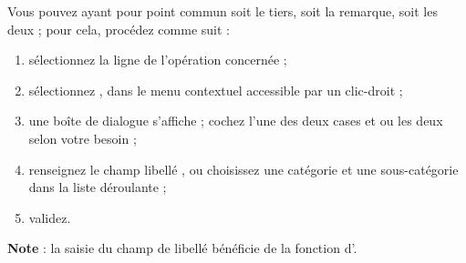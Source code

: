 Vous pouvez  ayant pour point commun soit le tiers, soit la remarque, soit les deux ; pour cela, procédez comme suit :

\begin{enumerate}
	\ifIllustration
	\pichskip{8mm}
	\label{categories_transfer-img}
	\fi
	
	 \item sélectionnez la ligne de l'opération concernée ;
	 \item sélectionnez , dans le menu contextuel accessible par un  clic-droit ;
	 \item une boîte de dialogue s'affiche ; cochez l'une des deux cases  et  ou les deux selon votre besoin ;
	 \item renseignez le champ libellé , ou choisissez une catégorie et une sous-catégorie dans la liste déroulante ;
	 \item validez.
\end{enumerate}

\textbf{Note} : la saisie du champ de libellé  bénéficie de la fonction d'.


